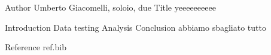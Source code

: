 Author Umberto Giacomelli, soloio, due
Title yeeeeeeeeee

Introduction
Data testing
Analysis
Conclusion abbiamo sbagliato tutto

Reference
ref.bib
